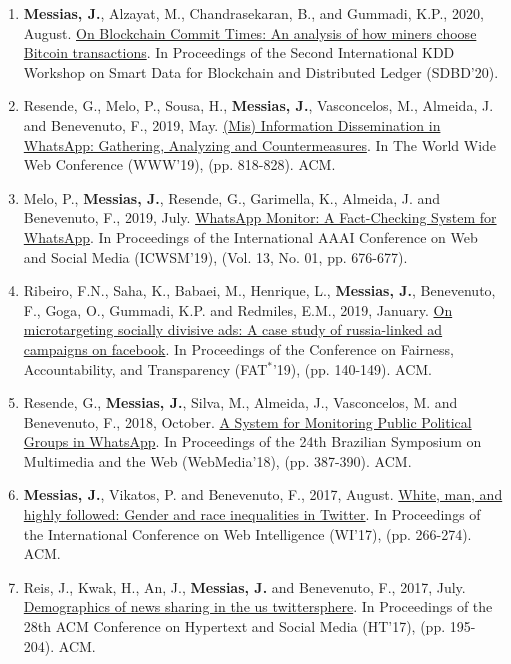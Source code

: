 \begin{enumerate}
    \item \textbf{Messias, J.}, Alzayat, M., Chandrasekaran, B., and Gummadi, K.P., 2020, August. \href{https://people.mpi-sws.org/~johnme/pdf/messias-sdbd-20.pdf}{On Blockchain Commit Times: An analysis of how miners choose Bitcoin transactions}. In Proceedings of the Second International KDD Workshop on Smart Data for Blockchain and Distributed Ledger (SDBD'20).
    \item Resende, G., Melo, P., Sousa, H., \textbf{Messias, J.}, Vasconcelos, M., Almeida, J. and Benevenuto, F., 2019, May. \href{https://people.mpi-sws.org/~johnme/pdf/resende_www2019_whatsapp.pdf}{(Mis) Information Dissemination in WhatsApp: Gathering, Analyzing and Countermeasures}. In The World Wide Web Conference (WWW'19), (pp. 818-828). ACM.
    \item Melo, P., \textbf{Messias, J.}, Resende, G., Garimella, K., Almeida, J. and Benevenuto, F., 2019, July. \href{https://people.mpi-sws.org/~johnme/pdf/melo-icwsm-2019-demo.pdf}{WhatsApp Monitor: A Fact-Checking System for WhatsApp}. In Proceedings of the International AAAI Conference on Web and Social Media (ICWSM'19), (Vol. 13, No. 01, pp. 676-677).
    \item Ribeiro, F.N., Saha, K., Babaei, M., Henrique, L., \textbf{Messias, J.}, Benevenuto, F., Goga, O., Gummadi, K.P. and Redmiles, E.M., 2019, January. \href{https://people.mpi-sws.org/~johnme/pdf/ribeiro_fat19_ira_ads.pdf}{On microtargeting socially divisive ads: A case study of russia-linked ad campaigns on facebook}. In Proceedings of the Conference on Fairness, Accountability, and Transparency (FAT$^{*}$'19), (pp. 140-149). ACM.
    \item Resende, G., \textbf{Messias, J.}, Silva, M., Almeida, J., Vasconcelos, M. and Benevenuto, F., 2018, October. \href{https://people.mpi-sws.org/~johnme/pdf/resende_webmedia2018_whatsapp.pdf}{A System for Monitoring Public Political Groups in WhatsApp}. In Proceedings of the 24th Brazilian Symposium on Multimedia and the Web (WebMedia'18), (pp. 387-390). ACM.
    \item \textbf{Messias, J.}, Vikatos, P. and Benevenuto, F., 2017, August. \href{https://people.mpi-sws.org/~johnme/pdf/messias_wi17_inequality.pdf}{White, man, and highly followed: Gender and race inequalities in Twitter}. In Proceedings of the International Conference on Web Intelligence (WI'17), (pp. 266-274). ACM.
    \item Reis, J., Kwak, H., An, J., \textbf{Messias, J.} and Benevenuto, F., 2017, July. \href{https://people.mpi-sws.org/~johnme/pdf/reis_ht17_news-sharing.pdf}{Demographics of news sharing in the us twittersphere}. In Proceedings of the 28th ACM Conference on Hypertext and Social Media (HT'17), (pp. 195-204). ACM.

\end{enumerate}
